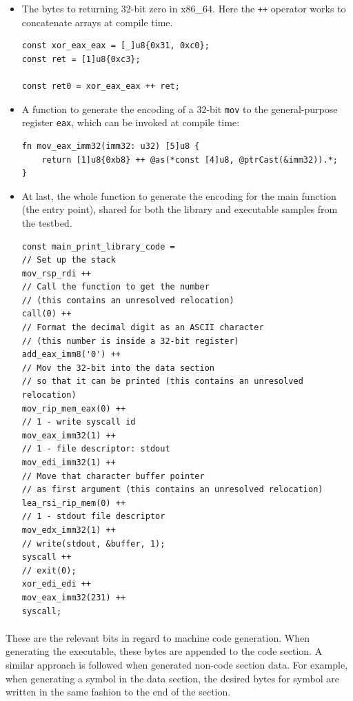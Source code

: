 \documentclass[12pt]{article}
\begin{document}
	\begin{itemize}
		\item The bytes to returning 32-bit zero in x86\_64. Here the \verb|++| operator works to concatenate arrays at compile time.
		\begin{verbatim}
const xor_eax_eax = [_]u8{0x31, 0xc0};
const ret = [1]u8{0xc3};
			
const ret0 = xor_eax_eax ++ ret;
		\end{verbatim}
		\item A function to generate the encoding of a 32-bit \verb|mov| to the general-purpose register \verb|eax|, which can be invoked at compile time:
		\begin{verbatim}
fn mov_eax_imm32(imm32: u32) [5]u8 {
	return [1]u8{0xb8} ++ @as(*const [4]u8, @ptrCast(&imm32)).*;
}
		\end{verbatim}
		\item At last, the whole function to generate the encoding for the main function (the entry point), shared for both the library and executable samples from the testbed.
		\begin{verbatim}
const main_print_library_code = 
// Set up the stack
mov_rsp_rdi ++
// Call the function to get the number
// (this contains an unresolved relocation)
call(0) ++
// Format the decimal digit as an ASCII character
// (this number is inside a 32-bit register)
add_eax_imm8('0') ++
// Mov the 32-bit into the data section
// so that it can be printed (this contains an unresolved relocation)
mov_rip_mem_eax(0) ++ 
// 1 - write syscall id
mov_eax_imm32(1) ++
// 1 - file descriptor: stdout
mov_edi_imm32(1) ++
// Move that character buffer pointer
// as first argument (this contains an unresolved relocation)
lea_rsi_rip_mem(0) ++ 
// 1 - stdout file descriptor
mov_edx_imm32(1) ++
// write(stdout, &buffer, 1);
syscall ++
// exit(0);
xor_edi_edi ++
mov_eax_imm32(231) ++
syscall;
		\end{verbatim}
	\end{itemize}

	\paragraph{}These are the relevant bits in regard to machine code generation. When generating the executable, these bytes are appended to the code section. A similar approach is followed when generated non-code section data. For example, when generating a symbol in the data section, the desired bytes for symbol are written in the same fashion to the end of the section.
\end{document}
